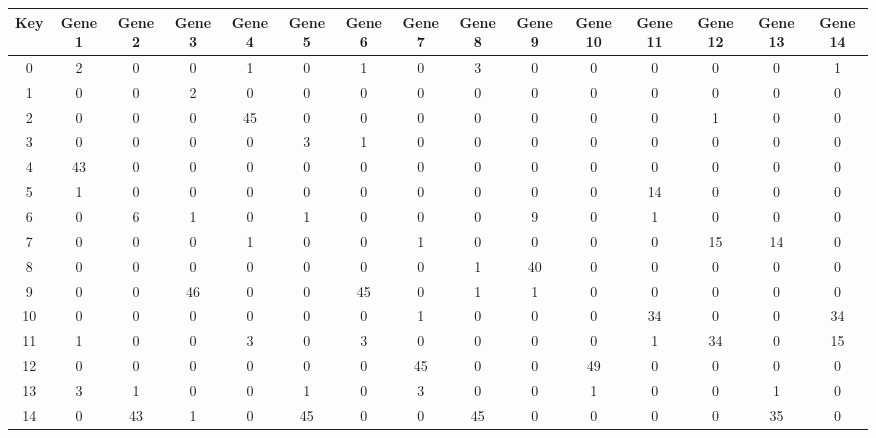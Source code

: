 \begin{tabular}{|c|c|c|c|c|c|c|c|c|c|c|c|c|c|c|}
\hline
Key & Gene 1 & Gene 2 & Gene 3 & Gene 4 & Gene 5 & Gene 6 & Gene 7 & Gene 8 & Gene 9 & Gene 10 & Gene 11 & Gene 12 & Gene 13 & Gene 14 \\
\hline
0 & 2 & 0 & 0 & 1 & 0 & 1 & 0 & 3 & 0 & 0 & 0 & 0 & 0 & 1 \\
1 & 0 & 0 & 2 & 0 & 0 & 0 & 0 & 0 & 0 & 0 & 0 & 0 & 0 & 0 \\
2 & 0 & 0 & 0 & 45 & 0 & 0 & 0 & 0 & 0 & 0 & 0 & 1 & 0 & 0 \\
3 & 0 & 0 & 0 & 0 & 3 & 1 & 0 & 0 & 0 & 0 & 0 & 0 & 0 & 0 \\
4 & 43 & 0 & 0 & 0 & 0 & 0 & 0 & 0 & 0 & 0 & 0 & 0 & 0 & 0 \\
5 & 1 & 0 & 0 & 0 & 0 & 0 & 0 & 0 & 0 & 0 & 14 & 0 & 0 & 0 \\
6 & 0 & 6 & 1 & 0 & 1 & 0 & 0 & 0 & 9 & 0 & 1 & 0 & 0 & 0 \\
7 & 0 & 0 & 0 & 1 & 0 & 0 & 1 & 0 & 0 & 0 & 0 & 15 & 14 & 0 \\
8 & 0 & 0 & 0 & 0 & 0 & 0 & 0 & 1 & 40 & 0 & 0 & 0 & 0 & 0 \\
9 & 0 & 0 & 46 & 0 & 0 & 45 & 0 & 1 & 1 & 0 & 0 & 0 & 0 & 0 \\
10 & 0 & 0 & 0 & 0 & 0 & 0 & 1 & 0 & 0 & 0 & 34 & 0 & 0 & 34 \\
11 & 1 & 0 & 0 & 3 & 0 & 3 & 0 & 0 & 0 & 0 & 1 & 34 & 0 & 15 \\
12 & 0 & 0 & 0 & 0 & 0 & 0 & 45 & 0 & 0 & 49 & 0 & 0 & 0 & 0 \\
13 & 3 & 1 & 0 & 0 & 1 & 0 & 3 & 0 & 0 & 1 & 0 & 0 & 1 & 0 \\
14 & 0 & 43 & 1 & 0 & 45 & 0 & 0 & 45 & 0 & 0 & 0 & 0 & 35 & 0 \\
\hline
\end{tabular}